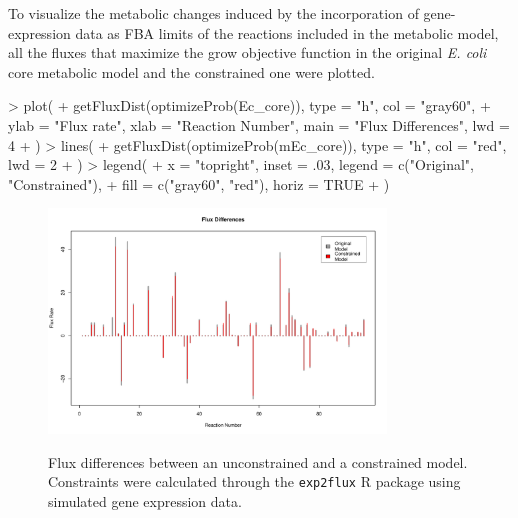 To visualize the metabolic changes induced by the incorporation of gene-expression data as FBA limits of the reactions included in the metabolic model, all the fluxes that maximize the grow objective function in the original \textit{E. coli} core metabolic model and the constrained one were plotted.
\begin{Schunk}
\begin{Sinput}
> plot(
+   getFluxDist(optimizeProb(Ec_core)), type = "h", col = "gray60",
+   ylab = "Flux rate", xlab = "Reaction Number", main = "Flux Differences", lwd = 4
+ )
> lines(
+   getFluxDist(optimizeProb(mEc_core)), type = "h", col = "red", lwd = 2
+ )
> legend(
+   x = "topright", inset = .03, legend = c("Original\nModel", "Constrained\nModel"),
+   fill = c("gray60", "red"), horiz = TRUE
+ )
\end{Sinput}
\end{Schunk}
\begin{figure}[h]
\begin{center}
\includegraphics[width=0.8\textwidth]{exp2flux/exp2flux-001}\\
\caption{Flux differences between an unconstrained and a constrained model. Constraints were calculated through the \texttt{exp2flux} R package using simulated gene expression data.}
\label{exp2fluxFlux}
\end{center}
\end{figure}
